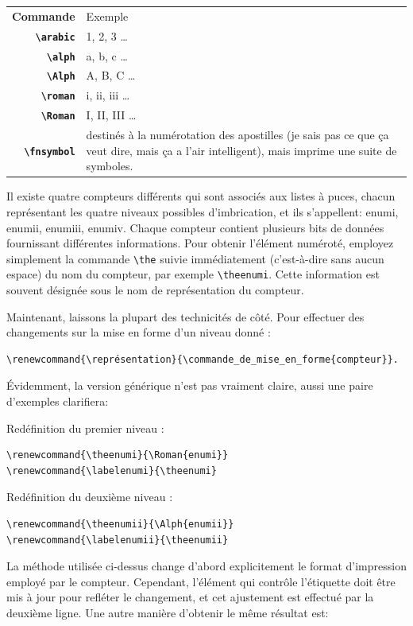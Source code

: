 \documentclass[a4paper,twoside]{article}
\begin{document}
\begin{tabular}{>{\bfseries}r<{}@{ : }p{11cm}}
Commande &	Exemple\\
\verb|\arabic| & 1, 2, 3 \ldots\\
\verb|\alph| &	a, b, c \ldots\\
\verb|\Alph| &	A, B, C \ldots\\
\verb|\roman| &	i, ii, iii \ldots\\
\verb|\Roman| &	I, II, III \ldots\\
\verb|\fnsymbol| &	destinés à la numérotation des apostilles (je sais pas ce que ça veut dire, mais ça a l'air intelligent), mais imprime une suite de symboles.
\end{tabular}


Il existe quatre compteurs différents qui sont associés aux listes à puces, chacun représentant les quatre niveaux possibles d'imbrication, et ils s'appellent: enumi, enumii, enumiii, enumiv. Chaque compteur contient plusieurs bits de données fournissant différentes informations. Pour obtenir l'élément numéroté, employez simplement la commande \verb|\the| suivie immédiatement (c'est-à-dire sans aucun espace) du nom du compteur, par exemple \verb|\theenumi|. Cette information est souvent désignée sous le nom de représentation du compteur.

Maintenant, laissons la plupart des technicités de côté. Pour effectuer des changements sur la mise en forme d'un niveau donné :

\begin{verbatim}
\renewcommand{\représentation}{\commande_de_mise_en_forme{compteur}}.
\end{verbatim}

Évidemment, la version générique n'est pas vraiment claire, aussi une paire d'exemples clarifiera:

Redéfinition du premier niveau :

\begin{verbatim}
\renewcommand{\theenumi}{\Roman{enumi}}
\renewcommand{\labelenumi}{\theenumi}
\end{verbatim}

Redéfinition du deuxième niveau :

\begin{verbatim}
\renewcommand{\theenumii}{\Alph{enumii}}
\renewcommand{\labelenumii}{\theenumii}
\end{verbatim}

La méthode utilisée ci-dessus change d'abord explicitement le format d'impression employé par le compteur. Cependant, l'élément qui contrôle l'étiquette doit être mis à jour pour refléter le changement, et cet ajustement est effectué par la deuxième ligne. Une autre manière d'obtenir le même résultat est:
\end{document}
